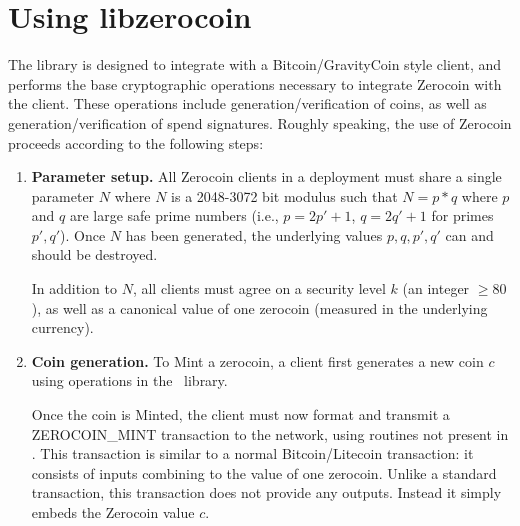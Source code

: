 \section{Using libzerocoin}

The \libzerocoin library is designed to integrate with a Bitcoin/GravityCoin style client, and performs the base cryptographic operations necessary to integrate Zerocoin with the client. These operations include generation/verification of coins, as well as generation/verification of spend signatures. Roughly speaking, the use of Zerocoin proceeds according to the following steps:

\begin{enumerate}
\item {\bf Parameter setup.} All Zerocoin clients in a deployment must share a single parameter $N$ where $N$ is a 2048-3072 bit modulus such that $N = p*q$ where $p$ and $q$ are large safe prime numbers (i.e., $p = 2p'+1$, $q = 2q'+1$ for primes $p', q'$). Once $N$ has been generated, the underlying values $p, q, p', q'$ can and should be destroyed.

In addition to $N$, all clients must agree on a security level $k$ (an integer $\ge 80$), as well as a canonical value of one zerocoin (measured in the underlying currency).

\item {\bf Coin generation.} To Mint a zerocoin, a client first generates a new coin $c$ using operations in the \libzerocoin~library.

Once the coin is Minted, the client must now format and transmit a \textsf{ZEROCOIN\_MINT} transaction to the network, using routines not present in \libzerocoin. This transaction is similar to a normal Bitcoin/Litecoin transaction: it consists of inputs combining to the value of one zerocoin. Unlike a standard transaction, this transaction does not provide any outputs. Instead it simply embeds the Zerocoin value $c$.

\end{enumerate}

